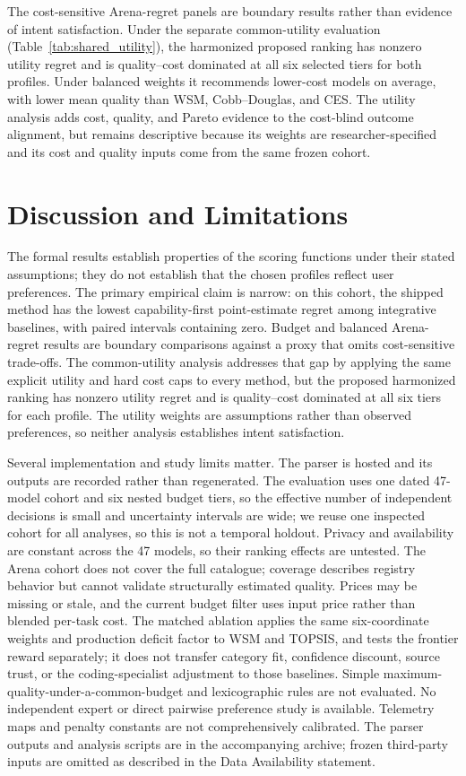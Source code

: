 \documentclass[pdflatex,sn-mathphys-num]{sn-jnl}
\theoremstyle{thmstyleone}
\theoremstyle{thmstylethree}
\begin{document}
The cost-sensitive Arena-regret panels are boundary results rather than evidence of intent satisfaction. Under the separate common-utility evaluation (Table~\ref{tab:shared_utility}), the harmonized proposed ranking has nonzero utility regret and is quality--cost dominated at all six selected tiers for both profiles. Under balanced weights it recommends lower-cost models on average, with lower mean quality than WSM, Cobb--Douglas, and CES. The utility analysis adds cost, quality, and Pareto evidence to the cost-blind outcome alignment, but remains descriptive because its weights are researcher-specified and its cost and quality inputs come from the same frozen cohort.

\FloatBarrier

\section{Discussion and Limitations}\label{sec:discussion}

The formal results establish properties of the scoring functions under their stated assumptions; they do not establish that the chosen profiles reflect user preferences. The primary empirical claim is narrow: on this cohort, the shipped method has the lowest capability-first point-estimate regret among integrative baselines, with paired intervals containing zero. Budget and balanced Arena-regret results are boundary comparisons against a proxy that omits cost-sensitive trade-offs. The common-utility analysis addresses that gap by applying the same explicit utility and hard cost caps to every method, but the proposed harmonized ranking has nonzero utility regret and is quality--cost dominated at all six tiers for each profile. The utility weights are assumptions rather than observed preferences, so neither analysis establishes intent satisfaction.

Several implementation and study limits matter. The parser is hosted and its outputs are recorded rather than regenerated. The evaluation uses one dated 47-model cohort and six nested budget tiers, so the effective number of independent decisions is small and uncertainty intervals are wide; we reuse one inspected cohort for all analyses, so this is not a temporal holdout. Privacy and availability are constant across the 47 models, so their ranking effects are untested. The Arena cohort does not cover the full catalogue; coverage describes registry behavior but cannot validate structurally estimated quality. Prices may be missing or stale, and the current budget filter uses input price rather than blended per-task cost. The matched ablation applies the same six-coordinate weights and production deficit factor to WSM and TOPSIS, and tests the frontier reward separately; it does not transfer category fit, confidence discount, source trust, or the coding-specialist adjustment to those baselines. Simple maximum-quality-under-a-common-budget and lexicographic rules are not evaluated. No independent expert or direct pairwise preference study is available. Telemetry maps and penalty constants are not comprehensively calibrated. The parser outputs and analysis scripts are in the accompanying archive; frozen third-party inputs are omitted as described in the Data Availability statement.
\end{document}

